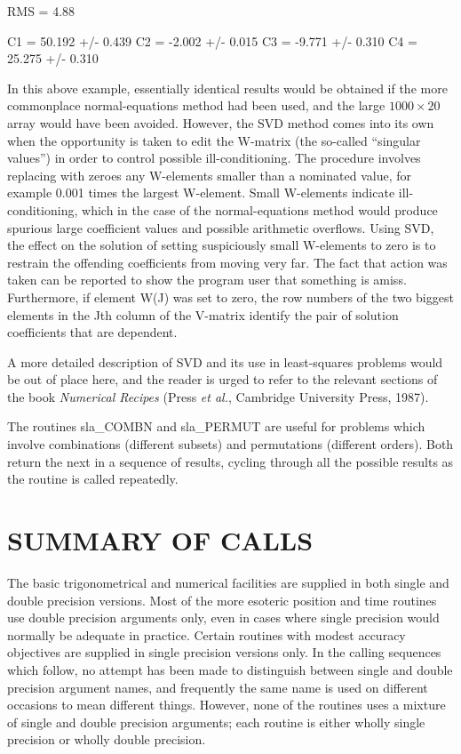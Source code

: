 \documentclass[11pt,twoside,nolof]{starlink}
\begin{document}
\goodbreak
\begin{terminalv}
            RMS = 4.88

            C1 = 50.192 +/- 0.439
            C2 = -2.002 +/- 0.015
            C3 = -9.771 +/- 0.310
            C4 = 25.275 +/- 0.310
\end{terminalv}
\goodbreak
In this above example, essentially
identical results would be obtained if the more
commonplace normal-equations method had been used, and the large
$1000\times20$ array would have been avoided.  However, the SVD method
comes into its own when the opportunity is taken to edit the W-matrix
(the so-called ``singular values'') in order to control
possible ill-conditioning.  The procedure involves replacing with
zeroes any W-elements smaller than a nominated value, for example
0.001 times the largest W-element.  Small W-elements indicate
ill-conditioning, which in the case of the normal-equations
method would produce spurious large coefficient values and
possible arithmetic overflows.  Using SVD, the effect on the solution
of setting suspiciously small W-elements to zero is to restrain
the offending coefficients from moving very far.  The
fact that action was taken can be reported to show the program user that
something is amiss.  Furthermore, if element W(J) was set to zero,
the row numbers of the two biggest elements in the Jth column of the
V-matrix identify the pair of solution coefficients that are
dependent.

A more detailed description of SVD and its use in least-squares
problems would be out of place here, and the reader is urged
to refer to the relevant sections of the book \textit{Numerical Recipes}
(Press \textit{et al.}, Cambridge University Press, 1987).

The routines
sla\_COMBN
and
sla\_PERMUT
are useful for problems which involve combinations (different subsets)
and permutations (different orders).
Both return the next in a sequence of results, cycling through all the
possible results as the routine is called repeatedly.

\vfill

\pagebreak

\section{SUMMARY OF CALLS}
The basic trigonometrical and numerical facilities are supplied in both single
and double precision versions.
Most of the more esoteric position and time routines use double precision
arguments only, even in cases where single precision would normally be adequate
in practice.
Certain routines with modest accuracy objectives are supplied in
single precision versions only.
In the calling sequences which follow, no attempt has been made
to distinguish between single and double precision argument names,
and frequently the same name is used on different occasions to
mean different things.
However, none of the routines uses a mixture of single and
double precision arguments;  each routine is either wholly
single precision or wholly double precision.
\end{document}
